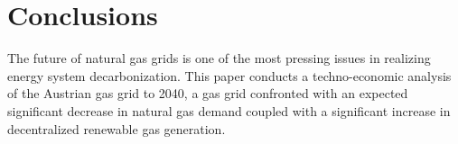 \section{Conclusions}\label{conclusions}
The future of natural gas grids is one of the most pressing issues in realizing energy system decarbonization. This paper conducts a techno-economic analysis of the Austrian gas grid to 2040, a gas grid confronted with an expected significant decrease in natural gas demand coupled with a significant increase in decentralized renewable gas generation.  

























